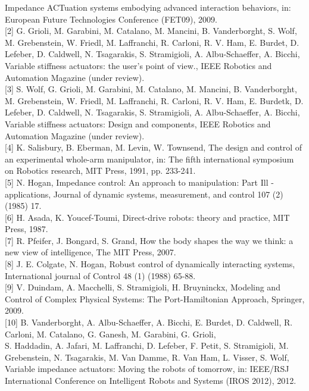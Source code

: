 \documentclass[10pt]{article}
\begin{document}
Impedance ACTuation systems embodying advanced interaction behaviors, in: European Future Technologies Conference (FET09), 2009.\\[0pt]
[2] G. Grioli, M. Garabini, M. Catalano, M. Mancini, B. Vanderborght, S. Wolf, M. Grebenstein, W. Friedl, M. Laffranchi, R. Carloni, R. V. Ham, E. Burdet, D. Lefeber, D. Caldwell, N. Tsagarakis, S. Stramigioli, A. Albu-Schaeffer, A. Bicchi, Variable stiffness actuators: the user's point of view., IEEE Robotics and Automation Magazine (under review).\\[0pt]
[3] S. Wolf, G. Grioli, M. Garabini, M. Catalano, M. Mancini, B. Vanderborght, M. Grebenstein, W. Friedl, M. Laffranchi, R. Carloni, R. V. Ham, E. Burdetk, D. Lefeber, D. Caldwell, N. Tsagarakis, S. Stramigioli, A. Albu-Schaeffer, A. Bicchi, Variable stiffness actuators: Design and components, IEEE Robotics and Automation Magazine (under review).\\[0pt]
[4] K. Salisbury, B. Eberman, M. Levin, W. Townsend, The design and control of an experimental whole-arm manipulator, in: The fifth international symposium on Robotics research, MIT Press, 1991, pp. 233-241.\\[0pt]
[5] N. Hogan, Impedance control: An approach to manipulation: Part Ill - applications, Journal of dynamic systems, measurement, and control 107 (2) (1985) 17.\\[0pt]
[6] H. Asada, K. Youcef-Toumi, Direct-drive robots: theory and practice, MIT Press, 1987.\\[0pt]
[7] R. Pfeifer, J. Bongard, S. Grand, How the body shapes the way we think: a new view of intelligence, The MIT Press, 2007.\\[0pt]
[8] J. E. Colgate, N. Hogan, Robust control of dynamically interacting systems, International journal of Control 48 (1) (1988) 65-88.\\[0pt]
[9] V. Duindam, A. Macchelli, S. Stramigioli, H. Bruyninckx, Modeling and Control of Complex Physical Systems: The Port-Hamiltonian Approach, Springer, 2009.\\[0pt]
[10] B. Vanderborght, A. Albu-Schaeffer, A. Bicchi, E. Burdet, D. Caldwell, R. Carloni, M. Catalano, G. Ganesh, M. Garabini, G. Grioli,\\
S. Haddadin, A. Jafari, M. Laffranchi, D. Lefeber, F. Petit, S. Stramigioli, M. Grebenstein, N. Tsagarakis, M. Van Damme, R. Van Ham, L. Visser, S. Wolf, Variable impedance actuators: Moving the robots of tomorrow, in: IEEE/RSJ International Conference on Intelligent Robots and Systems (IROS 2012), 2012.\\[0pt]
\end{document}
